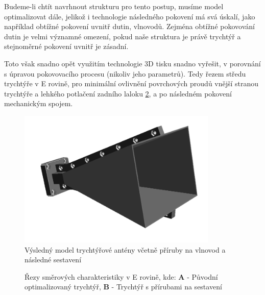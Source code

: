 Budeme-li chtít navrhnout strukturu pro tento postup, musíme model optimalizovat dále, jelikož i technologie následného pokovení má svá úskalí, jako například obtížné pokovení uvnitř dutin, vlnovodů. Zejména obtížné pokovování dutin je velmi významné omezení, pokud naše struktura je právě trychtýř a stejnoměrné pokovení uvnitř je zásadní.

Toto však snadno opět využitím technologie 3D tisku snadno vyřešit, v porovnání s úpravou pokovovacího procesu (nikoliv jeho parametrů). Tedy řezem středu trychtýře v E rovině, pro minimální ovlivnění povrchových proudů vnější stranou trychtýře a lehkého potlačení zadního laloku \ref{fig:hornCompareAssy}, a po následném pokovení mechanickým spojem. 

\begin{figure}[!htbp]
\begin{center}
\includegraphics[width=9.5cm]{pics/HornAssy}
\caption{Výsledný model trychtýřové antény včetně příruby na vlnovod a následné sestavení}
\label{fig:HornAssy}
\end{center}
\end{figure}

\begin{figure}[!htbp]
\caption{Řezy směrových charakteristiky v E rovině, kde: \textbf{A} - Původní optimalizovaný trychtýř, \textbf{B} - Trychtýř s přírubami na sestavení}
\label{fig:hornCompareAssy}
\end{figure}


